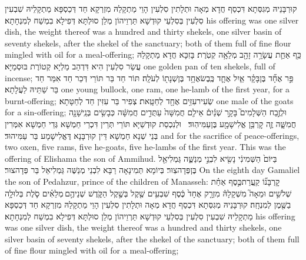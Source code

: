 {קוּרְבָּנֵיהּ מְגִסְּתָא דִּכְסַף חֲדָא מְאָה וּתְלָתִין סִלְעִין הָוֵי מַתְקָלַהּ מִזְרְקָא חַד דְּכַסְפָּא מַתְקָלֵיהּ שִׁבְעִין סִלְעִין בְּסִלְעֵי קוּדְשָׁא תַּרְוֵיהוֹן מְלַן סוּלְתָּא דְּפִילָא בִמְשַׁח לְמִנְחָתָא׃}
{his offering was one silver dish, the weight thereof was a hundred and thirty shekels, one silver basin of seventy shekels, after the shekel of the sanctuary; both of them full of fine flour mingled with oil for a meal-offering;}{}
{כַּ֥ף אַחַ֛ת עֲשָׂרָ֥ה זָהָ֖ב מְלֵאָ֥ה קְטֹֽרֶת׃}
{בָּזִכָּא חֲדָא מַתְקָלַהּ עֲשַׂר סִלְעִין הִיא דִּדְהַב מַלְיָא קְטוֹרֶת בּוּסְמַיָּא׃}
{one golden pan of ten shekels, full of incense;}{}
{פַּ֣ר אֶחָ֞ד בֶּן\maqqaf בָּקָ֗ר אַ֧יִל אֶחָ֛ד כֶּֽבֶשׂ\maqqaf אֶחָ֥ד בֶּן\maqqaf שְׁנָת֖וֹ לְעֹלָֽה׃}
{תּוֹר חַד בַּר תּוֹרֵי דְּכַר חַד אִמַּר חַד בַּר שַׁתֵּיהּ לַעֲלָתָא׃}
{one young bullock, one ram, one he-lamb of the first year, for a burnt-offering;}{}
{שְׂעִיר\maqqaf עִזִּ֥ים אֶחָ֖ד לְחַטָּֽאת׃}
{צְפִיר בַּר עִזִּין חַד לְחַטָּתָא׃}
{one male of the goats for a sin-offering;}{}
{וּלְזֶ֣בַח הַשְּׁלָמִים֮ בָּקָ֣ר שְׁנַ֒יִם֒ אֵילִ֤ם חֲמִשָּׁה֙ עַתֻּדִ֣ים חֲמִשָּׁ֔ה כְּבָשִׂ֥ים בְּנֵֽי\maqqaf שָׁנָ֖ה חֲמִשָּׁ֑ה זֶ֛ה קׇרְבַּ֥ן אֱלִישָׁמָ֖ע בֶּן\maqqaf עַמִּיהֽוּד׃ \petucha }
{וּלְנִכְסַת קוּדְשַׁיָּא תּוֹרֵי תְּרֵין דִּכְרֵי חַמְשָׁא גְּדֵי חַמְשָׁא אִמְּרִין בְּנֵי שְׁנָא חַמְשָׁא דֵּין קוּרְבָּנָא דֶּאֱלִישָׁמָע בַּר עַמִּיהוּד׃}
{and for the sacrifice of peace-offerings, two oxen, five rams, five he-goats, five he-lambs of the first year. This was the offering of Elishama the son of Ammihud.}{}
{בַּיּוֹם֙ הַשְּׁמִינִ֔י נָשִׂ֖יא לִבְנֵ֣י מְנַשֶּׁ֑ה גַּמְלִיאֵ֖ל בֶּן\maqqaf פְּדָהצֽוּר׃}
{בְּיוֹמָא תְּמִינָאָה רַבָּא לִבְנֵי מְנַשֶּׁה גַּמְלִיאֵל בַּר פְּדָהצוּר׃}
{On the eighth day Gamaliel the son of Pedahzur, prince of the children of Manasseh:}{}
{קׇרְבָּנ֞וֹ קַֽעֲרַת\maqqaf כֶּ֣סֶף אַחַ֗ת שְׁלֹשִׁ֣ים וּמֵאָה֮ מִשְׁקָלָהּ֒ מִזְרָ֤ק אֶחָד֙ כֶּ֔סֶף שִׁבְעִ֥ים שֶׁ֖קֶל בְּשֶׁ֣קֶל הַקֹּ֑דֶשׁ שְׁנֵיהֶ֣ם \legarmeh  מְלֵאִ֗ים סֹ֛לֶת בְּלוּלָ֥ה בַשֶּׁ֖מֶן לְמִנְחָֽה׃}
{קוּרְבָּנֵיהּ מְגִסְּתָא דִּכְסַף חֲדָא מְאָה וּתְלָתִין סִלְעִין הָוֵי מַתְקָלַהּ מִזְרְקָא חַד דְּכַסְפָּא מַתְקָלֵיהּ שִׁבְעִין סִלְעִין בְּסִלְעֵי קוּדְשָׁא תַּרְוֵיהוֹן מְלַן סוּלְתָּא דְּפִילָא בִמְשַׁח לְמִנְחָתָא׃}
{his offering was one silver dish, the weight thereof was a hundred and thirty shekels, one silver basin of seventy shekels, after the shekel of the sanctuary; both of them full of fine flour mingled with oil for a meal-offering;}{}
